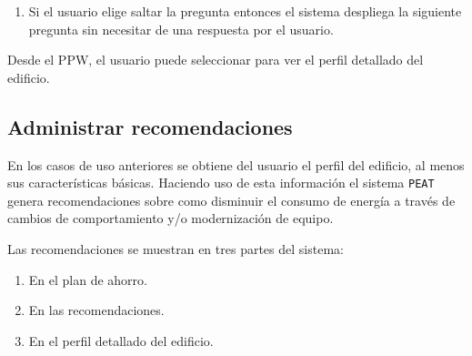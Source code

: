 \begin{usecase}
{\begin{enumerate}
\begin{enumerate}
\begin{enumerate}[i.]
          son recalculadas.
        \item El sistema despliega un indicador de progreso mientras
          se recalculan las recomendaciones.
        \item Al finalizar el refinamiento el orden de las preguntas
          o los valores del plan de ahorro deberán ser actualizados, sin recargar
          la página completa.
        \end{enumerate}
      \item El sistema despliega la siguiente pregunta.
      \item El sistema almacena la respuesta dada.
      \end{enumerate}
    \item Si el usuario elige saltar la pregunta entonces el sistema
      despliega la siguiente pregunta sin necesitar de una respuesta por el usuario.
    \end{enumerate}
  \item Desde el PPW, el usuario puede seleccionar  para
    ver el perfil detallado del edificio.
  }
\end{usecase}

\subsection{Administrar recomendaciones}

En los casos de uso anteriores se obtiene del usuario el perfil del edificio,
al menos sus características básicas. Haciendo uso de esta información
el sistema \texttt{PEAT} genera recomendaciones sobre como disminuir el consumo
de energía a través de cambios de comportamiento y/o modernización de equipo.

\vspace{2.5mm}

Las recomendaciones se muestran en tres partes del sistema:
\begin{enumerate}
\item En el plan de ahorro.
\item En las recomendaciones.
\item En el perfil detallado del edificio.
\end{enumerate}

